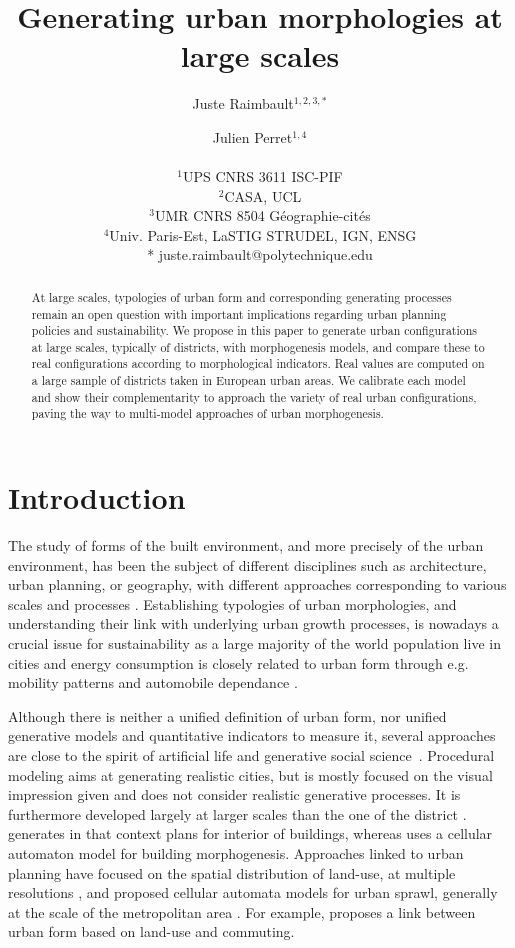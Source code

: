 \documentclass[letterpaper]{article}
\title{Generating urban morphologies at large scales}
\author{Juste Raimbault$^{1,2,3,*}$ \and Julien Perret$^{1,4}$ \\
\mbox{}\\
$^1$UPS CNRS 3611 ISC-PIF\\
$^2$CASA, UCL\\
$^3$UMR CNRS 8504 G{\'e}ographie-cit{\'e}s\\
$^4$Univ. Paris-Est, LaSTIG STRUDEL, IGN, ENSG\\
\medskip
* juste.raimbault@polytechnique.edu} %
\begin{document}
\maketitle

\begin{abstract}
  At large scales, typologies of urban form and corresponding generating processes remain an open question with important implications regarding urban planning policies and sustainability.
  We propose in this paper to generate urban configurations at large scales, typically of districts, with morphogenesis models, and compare these to real configurations according to morphological indicators.
  Real values are computed on a large sample of districts taken in European urban areas.
  We calibrate each model and show their complementarity to approach the variety of real urban configurations, paving the way to multi-model approaches of urban morphogenesis.
\end{abstract}


\section{Introduction}


The study of forms of the built environment, and more precisely of the urban environment, has been the subject of different disciplines such as architecture, urban planning, or geography, with different approaches corresponding to various scales and processes \citep{moudon1997urban,gauthier2006mapping,kropf2009aspects}.
Establishing typologies of urban morphologies, and understanding their link with underlying urban growth processes, is nowadays a crucial issue for sustainability as a large majority of the world population live in cities and energy consumption is closely related to urban form through e.g. mobility patterns and automobile dependance \citep{newman2000sustainable}.


Although there is neither a unified definition of urban form, nor unified generative models and quantitative indicators to measure it, several approaches are close to the spirit of artificial life and generative social science~\citep{bonabeau1997classical,epstein1999agent}.
Procedural modeling \citep{watson2008procedural} aims at generating realistic cities, but is mostly focused on the visual impression given and does not consider realistic generative processes.
It is furthermore developed largely at larger scales than the one of the district \citep{Parish:2001:PMC:383259.383292}. \cite{merrell2010computer} generates in that context plans for interior of buildings, whereas \cite{cruz2017generation} uses a cellular automaton model for building morphogenesis.
Approaches linked to urban planning have focused on the spatial distribution of land-use, at multiple resolutions \citep{liu2017future}, and proposed cellular automata models for urban sprawl, generally at the scale of the metropolitan area \citep{herold2003spatiotemporal}. For example, \cite{horner2007multi} proposes a link between urban form based on land-use and commuting.
\end{document}
